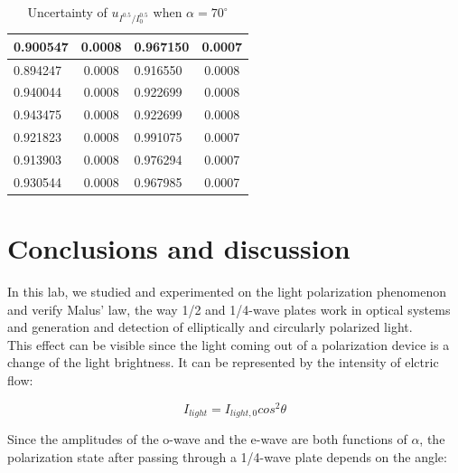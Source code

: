 \documentclass[12pt, a4paper]{article}
\begin{document}
\begin{table}[H]
\begin{tabular}{|l|cl|l|cl|}
	0.900547        & \multicolumn{2}{c|}{0.0008}                                & 0.967150        & \multicolumn{2}{c|}{0.0007}                                \\ \hline
	0.894247        & \multicolumn{2}{c|}{0.0008}                                & 0.916550        & \multicolumn{2}{c|}{0.0008}                                \\ \hline
	0.940044        & \multicolumn{2}{c|}{0.0008}                                & 0.922699        & \multicolumn{2}{c|}{0.0008}                                \\ \hline
	0.943475        & \multicolumn{2}{c|}{0.0008}                                & 0.922699        & \multicolumn{2}{c|}{0.0008}                                \\ \hline
	0.921823        & \multicolumn{2}{c|}{0.0008}                                & 0.991075        & \multicolumn{2}{c|}{0.0007}                                \\ \hline
	0.913903        & \multicolumn{2}{c|}{0.0008}                                & 0.976294        & \multicolumn{2}{c|}{0.0007}                                \\ \hline
	0.930544        & \multicolumn{2}{c|}{0.0008}                                & 0.967985        & \multicolumn{2}{c|}{0.0007}                                \\ \hline
	\end{tabular}
	\caption{Uncertainty of $u_{I^{0.5} / I^{0.5}_{0}}$ when $\alpha = 70^{\circ}$}
	\label{tab-5}
	\end{table}

\newpage

\section{Conclusions and discussion}
In this lab, we studied and experimented on the light polarization phenomenon and verify Malus' law, the way 1/2 and 1/4-wave plates work in optical systems and generation and detection of elliptically and circularly polarized light.\\

This effect can be visible since the light coming out of a polarization device is a change of the light brightness. It can be represented by the intensity of elctric flow:

$$I_{light}=I_{light,0}cos^2\theta$$

Since the amplitudes of the o-wave and the e-wave are both functions of $ \alpha $, the polarization state after passing through a 1/4-wave plate depends on the angle:\\
\end{document}
